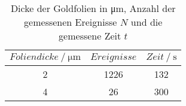 \begin{table}[H] 
   \centering 
   \caption{Dicke der Goldfolien in \si{\micro \meter}, Anzahl der gemessenen Ereignisse $N$ und die gemessene Zeit $t$} 
   \label{tab:foliendicke} 
   \begin{tabular} { c c c } 
 \toprule 
 {$Foliendicke\:/\: \si{\micro \meter}$} & {$Ereignisse$} & {$Zeit\:/\: \mathrm{s}$} \\ 
    \midrule 
    2 & 1226 & 132 \\ 
    4 & 26 & 300 \\ 
    \bottomrule 
  \end{tabular}
\end{table}